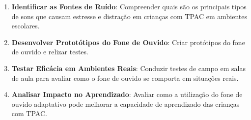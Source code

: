 \begin{enumerate}
    \item \textbf{Identificar as Fontes de Ruído}: Compreender quais são os principais tipos de sons que causam estresse e distração em crianças com TPAC em ambientes escolares.
    
    \item \textbf{Desenvolver Prototótipos do Fone de Ouvido}: Criar protótipos do fone de ouvido e relizar testes.
    
    \item \textbf{Testar Eficácia em Ambientes Reais}: Conduzir testes de campo em salas de aula para avaliar como o fone de ouvido se comporta em situações reais.
    
    \item \textbf{Analisar Impacto no Aprendizado}: Avaliar como a utilização do fone de ouvido adaptativo pode melhorar a capacidade de aprendizado das crianças com TPAC.
\end{enumerate}